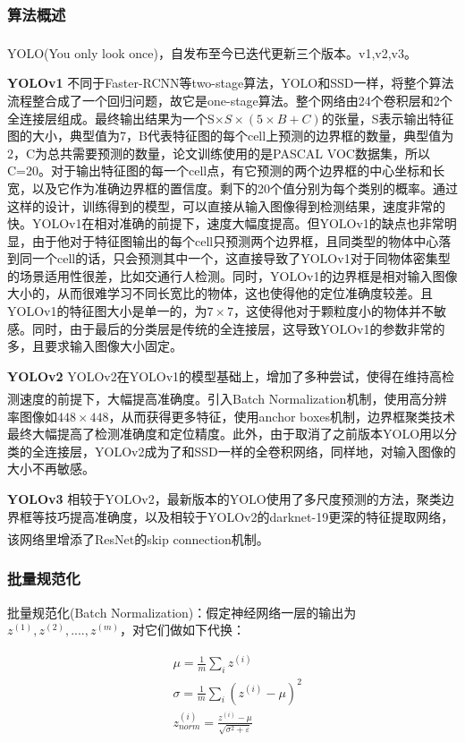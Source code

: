 \documentclass[12pt,a4paper,titlepage]{article}
\newcommand{\upcite}[1]{\textsuperscript{\textsuperscript{\cite{#1}}}}  %
\begin{document}
\subsubsection{算法概述}
YOLO(You only look once)，自发布至今已迭代更新三个版本。v1\upcite{redmon2016you},v2\upcite{redmon2017yolo9000},v3\upcite{yolov3}。\par
\textbf{YOLOv1} 不同于Faster-RCNN等two-stage算法，YOLO和SSD一样，将整个算法流程整合成了一个回归问题，故它是one-stage算法。整个网络由24个卷积层和2个全连接层组成。最终输出结果为一个S$\times S \times(5\times B + C)$的张量，S表示输出特征图的大小，典型值为7，B代表特征图的每个cell上预测的边界框的数量，典型值为2，C为总共需要预测的数量，论文训练使用的是PASCAL VOC数据集，所以C=20。对于输出特征图的每一个cell点，有它预测的两个边界框的中心坐标和长宽，以及它作为准确边界框的置信度。剩下的20个值分别为每个类别的概率。通过这样的设计，训练得到的模型，可以直接从输入图像得到检测结果，速度非常的快。YOLOv1在相对准确的前提下，速度大幅度提高。但YOLOv1的缺点也非常明显，由于他对于特征图输出的每个cell只预测两个边界框，且同类型的物体中心落到同一个cell的话，只会预测其中一个，这直接导致了YOLOv1对于同物体密集型的场景适用性很差，比如交通行人检测。同时，YOLOv1的边界框是相对输入图像大小的，从而很难学习不同长宽比的物体，这也使得他的定位准确度较差。且YOLOv1的特征图大小是单一的，为$7\times 7$，这使得他对于颗粒度小的物体并不敏感。同时，由于最后的分类层是传统的全连接层，这导致YOLOv1的参数非常的多，且要求输入图像大小固定。\par
\textbf{YOLOv2}  YOLOv2在YOLOv1的模型基础上，增加了多种尝试，使得在维持高检测速度的前提下，大幅提高准确度。引入Batch Normalization\upcite{ioffe2015batch}机制，使用高分辨率图像如$448 \times 448$，从而获得更多特征，使用anchor boxes机制，边界框聚类技术最终大幅提高了检测准确度和定位精度。此外，由于取消了之前版本YOLO用以分类的全连接层，YOLOv2成为了和SSD一样的全卷积网络，同样地，对输入图像的大小不再敏感。\par
\textbf{YOLOv3}  相较于YOLOv2，最新版本的YOLO使用了多尺度预测的方法，聚类边界框等技巧提高准确度，以及相较于YOLOv2的darknet-19更深的特征提取网络，该网络里增添了ResNet\upcite{he2016deep}的skip connection机制。

\subsubsection{批量规范化}
批量规范化(Batch Normalization)：假定神经网络一层的输出为$z^{(1)}, z^{(2)}, .... , z^{(m)}$，对它们做如下代换：

\begin{align}
 &\mu = \frac{1}{m}\sum_iz^{(i)} \\
 &\sigma = \frac{1}{m}\sum_i(z^{(i)}-\mu)^2 \\
 &z^{(i)}_{norm} = \frac{z^{(i)}-\mu}{\sqrt{\sigma^2+\varepsilon}}
\end{align}
\end{document}
